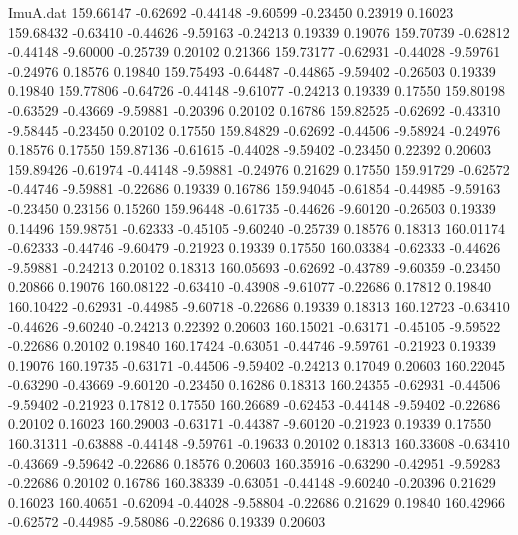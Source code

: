 \begin{filecontents}{ImuA.dat}
 159.66147   -0.62692   -0.44148   -9.60599   -0.23450    0.23919    0.16023
 159.68432   -0.63410   -0.44626   -9.59163   -0.24213    0.19339    0.19076
 159.70739   -0.62812   -0.44148   -9.60000   -0.25739    0.20102    0.21366
 159.73177   -0.62931   -0.44028   -9.59761   -0.24976    0.18576    0.19840
 159.75493   -0.64487   -0.44865   -9.59402   -0.26503    0.19339    0.19840
 159.77806   -0.64726   -0.44148   -9.61077   -0.24213    0.19339    0.17550
 159.80198   -0.63529   -0.43669   -9.59881   -0.20396    0.20102    0.16786
 159.82525   -0.62692   -0.43310   -9.58445   -0.23450    0.20102    0.17550
 159.84829   -0.62692   -0.44506   -9.58924   -0.24976    0.18576    0.17550
 159.87136   -0.61615   -0.44028   -9.59402   -0.23450    0.22392    0.20603
 159.89426   -0.61974   -0.44148   -9.59881   -0.24976    0.21629    0.17550
 159.91729   -0.62572   -0.44746   -9.59881   -0.22686    0.19339    0.16786
 159.94045   -0.61854   -0.44985   -9.59163   -0.23450    0.23156    0.15260
 159.96448   -0.61735   -0.44626   -9.60120   -0.26503    0.19339    0.14496
 159.98751   -0.62333   -0.45105   -9.60240   -0.25739    0.18576    0.18313
 160.01174   -0.62333   -0.44746   -9.60479   -0.21923    0.19339    0.17550
 160.03384   -0.62333   -0.44626   -9.59881   -0.24213    0.20102    0.18313
 160.05693   -0.62692   -0.43789   -9.60359   -0.23450    0.20866    0.19076
 160.08122   -0.63410   -0.43908   -9.61077   -0.22686    0.17812    0.19840
 160.10422   -0.62931   -0.44985   -9.60718   -0.22686    0.19339    0.18313
 160.12723   -0.63410   -0.44626   -9.60240   -0.24213    0.22392    0.20603
 160.15021   -0.63171   -0.45105   -9.59522   -0.22686    0.20102    0.19840
 160.17424   -0.63051   -0.44746   -9.59761   -0.21923    0.19339    0.19076
 160.19735   -0.63171   -0.44506   -9.59402   -0.24213    0.17049    0.20603
 160.22045   -0.63290   -0.43669   -9.60120   -0.23450    0.16286    0.18313
 160.24355   -0.62931   -0.44506   -9.59402   -0.21923    0.17812    0.17550
 160.26689   -0.62453   -0.44148   -9.59402   -0.22686    0.20102    0.16023
 160.29003   -0.63171   -0.44387   -9.60120   -0.21923    0.19339    0.17550
 160.31311   -0.63888   -0.44148   -9.59761   -0.19633    0.20102    0.18313
 160.33608   -0.63410   -0.43669   -9.59642   -0.22686    0.18576    0.20603
 160.35916   -0.63290   -0.42951   -9.59283   -0.22686    0.20102    0.16786
 160.38339   -0.63051   -0.44148   -9.60240   -0.20396    0.21629    0.16023
 160.40651   -0.62094   -0.44028   -9.58804   -0.22686    0.21629    0.19840
 160.42966   -0.62572   -0.44985   -9.58086   -0.22686    0.19339    0.20603

\end{filecontents}
